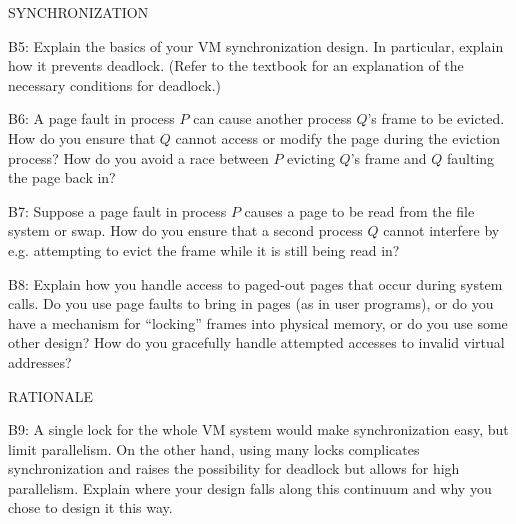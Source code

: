\begin{aspect}{SYNCHRONIZATION}
	\begin{qc}
		B5: Explain the basics of your VM synchronization design.
		In particular, explain how it prevents deadlock.
		(Refer to the textbook for an explanation of the necessary conditions for deadlock.)
	\end{qc}

	\begin{qc}
		B6: A page fault in process $P$ can cause another process $Q$'s frame to be evicted.
		How do you ensure that $Q$ cannot access or modify the page during the eviction process?
		How do you avoid a race between $P$ evicting $Q$'s frame and $Q$ faulting the page back in?
	\end{qc}

	\begin{qc}
		B7: Suppose a page fault in process $P$ causes a page to be read from the file system or swap.
		How do you ensure that a second process $Q$ cannot interfere
		by e.g. attempting to evict the frame while it is still being read in?
	\end{qc}

	\begin{qc}
		B8: Explain how you handle access to paged-out pages that occur during system calls.
		Do you use page faults to bring in pages (as in user programs),
		or do you have a mechanism for ``locking'' frames into physical memory,
		or do you use some other design?
		How do you gracefully handle attempted accesses to invalid virtual addresses?
	\end{qc}
\end{aspect}


\begin{aspect}{RATIONALE}
	\begin{qc}
		B9: A single lock for the whole VM system would make synchronization easy, but limit parallelism.
		On the other hand, using many locks complicates synchronization and raises the
		possibility for deadlock but allows for high parallelism.
		Explain where your design falls along this continuum and why you chose to design it this way.
	\end{qc}
\end{aspect}
